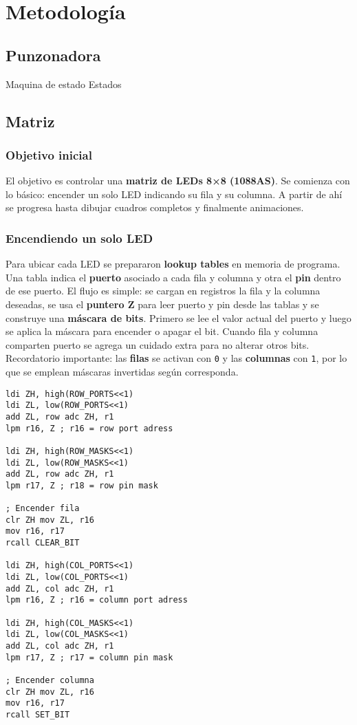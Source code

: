 \section{Metodología}
\subsection{Punzonadora}
Maquina de estado
Estados


\subsection{Matriz}

\subsubsection{Objetivo inicial}
El objetivo es controlar una \textbf{matriz de LEDs 8×8 (1088AS)}. Se comienza con lo básico: encender un solo LED indicando su fila y su columna. A partir de ahí se progresa hasta dibujar cuadros completos y finalmente animaciones.

\subsubsection{Encendiendo un solo LED}
Para ubicar cada LED se prepararon \textbf{lookup tables} en memoria de programa. Una tabla indica el \textbf{puerto} asociado a cada fila y columna y otra el \textbf{pin} dentro de ese puerto. El flujo es simple: se cargan en registros la fila y la columna deseadas, se usa el \textbf{puntero Z} para leer puerto y pin desde las tablas y se construye una \textbf{máscara de bits}. Primero se lee el valor actual del puerto y luego se aplica la máscara para encender o apagar el bit. Cuando fila y columna comparten puerto se agrega un cuidado extra para no alterar otros bits. Recordatorio importante: las \textbf{filas} se activan con \texttt{0} y las \textbf{columnas} con \texttt{1}, por lo que se emplean máscaras invertidas según corresponda.

\begin{verbatim}
ldi ZH, high(ROW_PORTS<<1) 
ldi ZL, low(ROW_PORTS<<1)
add ZL, row adc ZH, r1  
lpm r16, Z ; r16 = row port adress
        
ldi ZH, high(ROW_MASKS<<1) 
ldi ZL, low(ROW_MASKS<<1)
add ZL, row adc ZH, r1
lpm r17, Z ; r18 = row pin mask

; Encender fila
clr ZH mov ZL, r16 
mov r16, r17
rcall CLEAR_BIT

ldi ZH, high(COL_PORTS<<1) 
ldi ZL, low(COL_PORTS<<1)  
add ZL, col adc ZH, r1  
lpm r16, Z ; r16 = column port adress

ldi ZH, high(COL_MASKS<<1) 
ldi ZL, low(COL_MASKS<<1)  
add ZL, col adc ZH, r1  
lpm r17, Z ; r17 = column pin mask

; Encender columna
clr ZH mov ZL, r16 
mov r16, r17
rcall SET_BIT
\end{verbatim}

